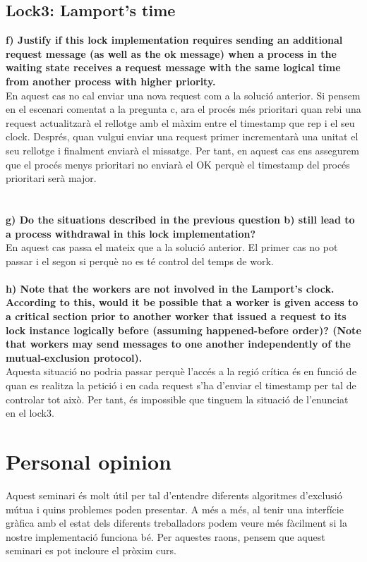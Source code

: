 \documentclass[a4paper, 10pt]{article}
\begin{document}
\subsection{\textbf{Lock3: Lamport's time}}
\textbf{f) Justify if this lock implementation requires sending an additional request message (as well as the ok message) when a process in the waiting state receives a request message with the same logical time from another process with higher priority.\\}
En aquest cas no cal enviar una nova request com a la solució anterior. Si pensem en el escenari comentat a la pregunta c, ara el procés més prioritari quan rebi una request actualitzarà el rellotge amb el màxim entre el timestamp que rep i el seu clock. Després, quan vulgui enviar una request primer incrementarà una unitat el seu rellotge i finalment enviarà el missatge. Per tant, en aquest cas ens assegurem que el procés menys prioritari no enviarà el OK perquè el timestamp del procés prioritari serà major.\\\\\\ 
\textbf{g) Do the situations described in the previous question b) still lead to a process withdrawal in this lock implementation?\\}
En aquest cas passa el mateix que a la solució anterior. El primer cas no pot passar i el segon si perquè no es té control del temps de work.\\\\    
\textbf{h) Note that the workers are not involved in the Lamport’s clock. According to this, would it be possible that a worker is given access to a critical section prior to another worker that issued a request to its lock instance logically before (assuming happened-before order)? (Note that workers may send messages to one another independently of the mutual-exclusion protocol).\\}
Aquesta situació no podria passar perquè l’accés a la regió crítica és en funció de quan es realitza la petició i en cada request s’ha d’enviar el timestamp per tal de controlar tot això. Per tant, és impossible que tinguem la situació de l’enunciat en el lock3. 



\section{Personal opinion}
Aquest seminari és molt útil per tal d’entendre diferents algoritmes d’exclusió mútua i quins problemes poden presentar. A més a més, al tenir una interfície gràfica amb el estat dels diferents treballadors podem veure més fàcilment si la nostre implementació funciona bé. Per aquestes raons, pensem que aquest seminari es pot incloure el pròxim curs. 
\end{document}
